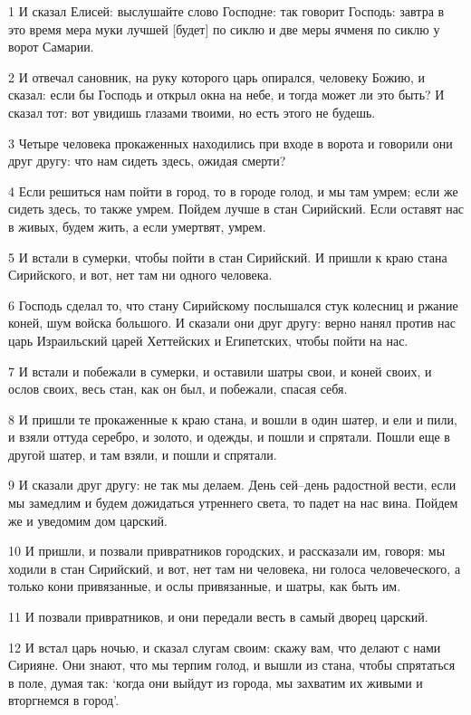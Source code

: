 \par 1 И сказал Елисей: выслушайте слово Господне: так говорит Господь: завтра в это время мера муки лучшей [будет] по сиклю и две меры ячменя по сиклю у ворот Самарии.
\par 2 И отвечал сановник, на руку которого царь опирался, человеку Божию, и сказал: если бы Господь и открыл окна на небе, и тогда может ли это быть? И сказал тот: вот увидишь глазами твоими, но есть этого не будешь.
\par 3 Четыре человека прокаженных находились при входе в ворота и говорили они друг другу: что нам сидеть здесь, ожидая смерти?
\par 4 Если решиться нам пойти в город, то в городе голод, и мы там умрем; если же сидеть здесь, то также умрем. Пойдем лучше в стан Сирийский. Если оставят нас в живых, будем жить, а если умертвят, умрем.
\par 5 И встали в сумерки, чтобы пойти в стан Сирийский. И пришли к краю стана Сирийского, и вот, нет там ни одного человека.
\par 6 Господь сделал то, что стану Сирийскому послышался стук колесниц и ржание коней, шум войска большого. И сказали они друг другу: верно нанял против нас царь Израильский царей Хеттейских и Египетских, чтобы пойти на нас.
\par 7 И встали и побежали в сумерки, и оставили шатры свои, и коней своих, и ослов своих, весь стан, как он был, и побежали, спасая себя.
\par 8 И пришли те прокаженные к краю стана, и вошли в один шатер, и ели и пили, и взяли оттуда серебро, и золото, и одежды, и пошли и спрятали. Пошли еще в другой шатер, и там взяли, и пошли и спрятали.
\par 9 И сказали друг другу: не так мы делаем. День сей--день радостной вести, если мы замедлим и будем дожидаться утреннего света, то падет на нас вина. Пойдем же и уведомим дом царский.
\par 10 И пришли, и позвали привратников городских, и рассказали им, говоря: мы ходили в стан Сирийский, и вот, нет там ни человека, ни голоса человеческого, а только кони привязанные, и ослы привязанные, и шатры, как быть им.
\par 11 И позвали привратников, и они передали весть в самый дворец царский.
\par 12 И встал царь ночью, и сказал слугам своим: скажу вам, что делают с нами Сирияне. Они знают, что мы терпим голод, и вышли из стана, чтобы спрятаться в поле, думая так: `когда они выйдут из города, мы захватим их живыми и вторгнемся в город'.

